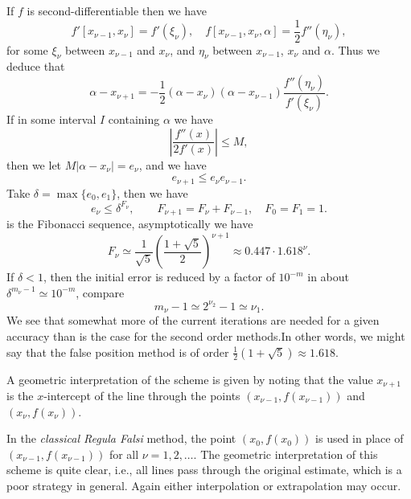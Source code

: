 \documentclass[../main.tex]{subfiles}
\begin{document}
If $f$ is second-differentiable then we have
\begin{equation*}
	f'[x_{\nu-1}, x_\nu] = f'(\xi_\nu), \quad f[x_{\nu-1}, x_\nu, \alpha] = \frac{1}{2} f''(\eta_\nu),
\end{equation*}
for some $\xi_\nu$ between $x_{\nu-1}$ and $x_\nu$, and $\eta_\nu$ between $x_{\nu-1}$, $x_\nu$ and $\alpha$. Thus we deduce that
\begin{equation}
	\alpha - x_{\nu+1} = -\frac{1}{2} (\alpha - x_\nu) (\alpha - x_{\nu-1}) \frac{f''(\eta_\nu)}{f'(\xi_\nu)}.
\end{equation}
If in some interval $I$ containing $\alpha$ we have
\begin{equation}
	\left| \frac{f''(x)}{2 f'(x)} \right| \leq M,
\end{equation}
then we let $M |\alpha - x_\nu| = e_\nu$, and we have
\begin{equation}
	e_{\nu+1} \leq e_\nu e_{\nu-1}.
\end{equation}
Take $\delta = \max\{e_0, e_1\}$, then we have
\begin{equation}
	e_\nu \leq \delta^{F_\nu}, \qquad F_{\nu + 1} = F_\nu + F_{\nu-1}, \quad F_0 = F_1 = 1.
\end{equation}
is the Fibonacci sequence, asymptotically we have
\begin{equation}
	F_\nu \simeq \frac{1}{\sqrt{5}} \left( \frac{1 + \sqrt{5}}{2} \right)^{\nu + 1} \approx 0.447 \cdot 1.618^\nu.
\end{equation}
If $\delta < 1$, then the initial error is reduced by a factor of $10^{-m}$ in about $\delta^{m_\nu - 1} \simeq 10^{-m}$, compare
\begin{equation*}
	m_\nu - 1 \simeq 2^{\nu_2} - 1 \simeq \nu_1.
\end{equation*}
We see that somewhat more of the current iterations are needed for a given accuracy than is the case for the second order methods.In other words, we might say that the false position method is of order $\frac{1}{2}(1 + \sqrt{5}) \approx 1.618$.

A geometric interpretation of the scheme is given by noting that the value $x_{\nu+1}$ is the $x$-intercept of the line through the points $(x_{\nu-1}, f(x_{\nu-1}))$ and $(x_\nu, f(x_\nu))$.

In the \textit{classical Regula Falsi} method, the point $(x_0, f(x_0))$ is used in place of $(x_{\nu - 1}, f(x_{\nu - 1}))$ for all $\nu = 1, 2, \dots$. The geometric interpretation of this scheme is quite clear, i.e., all lines pass through the original estimate, which is a poor strategy in general. Again either interpolation or extrapolation may occur.
\end{document}
